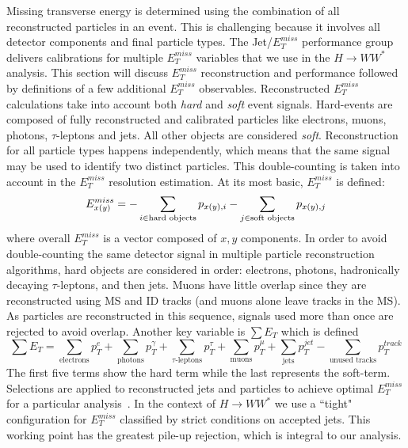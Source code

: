 Missing transverse energy is determined using the combination of all reconstructed particles in an event. This is challenging because it involves all detector components and final particle types. The Jet/$E_T^{miss}$ performance group delivers calibrations for multiple $E_T^{miss}$ variables that we use in the $H\rightarrow WW^*$ analysis. This section will discuss $E_T^{miss}$ reconstruction and performance followed by definitions of a few additional $E_T^{miss}$ observables. 
Reconstructed $E_T^{miss}$ calculations take into account both \textit{hard} and \textit{soft} event signals. Hard-events are composed of fully reconstructed and calibrated particles like electrons, muons, photons, $\tau$-leptons and jets. All other objects are considered \textit{soft}. Reconstruction for all particle types happens independently, which means that the same signal may be used to identify two distinct particles. This double-counting is taken into account in the $E_T^{miss}$ resolution estimation. At its most basic, $E_T^{miss}$ is defined:
\begin{equation}
E_{x(y)}^{miss}=-\sum_{i\in{\textnormal{hard objects}}}p_{x(y),i} -\sum_{j\in{\textnormal{soft objects}}}p_{x(y),j}
\end{equation}
where overall $E_T^{miss}$ is a vector composed of $x,y$ components. In order to avoid double-counting the same detector signal in multiple particle reconstruction algorithms, hard objects are considered in order: electrons, photons, hadronically decaying $\tau$-leptons, and then jets. Muons have little overlap since they are reconstructed using MS and ID tracks (and muons alone leave tracks in the MS). As particles are reconstructed in this sequence, signals used more than once are rejected to avoid overlap. Another key variable is $\sum E_T$ which is defined
\begin{equation}
\sum E_T = \sum_{\text{electrons}} p_T^e + \sum_{\text{photons}} p_T^\gamma + \sum_{\text{$\tau$-leptons}} p_T^\tau + \sum_{\text{muons}} p_T^\mu + \sum_{\text{jets}} p_T^{jet} - \sum_{\text{unused tracks}} p_T^{track}
\end{equation}
The first five terms show the hard term while the last represents the soft-term. Selections are applied to reconstructed jets and particles to achieve optimal $E_T^{miss}$ for a particular analysis~\cite{METPerf}. In the context of $H\rightarrow WW^*$ we use a ``tight" configuration for $E_T^{miss}$ classified by strict conditions on accepted jets. This working point has the greatest pile-up rejection, which is integral to our analysis. 

